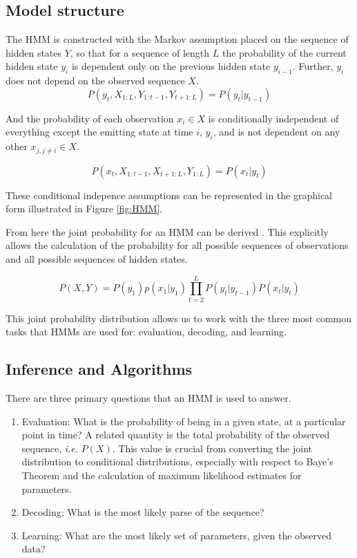 \subsection{Model structure}
The HMM is constructed with the Markov assumption placed on the sequence of hidden states $Y$, so that for a sequence of length $L$ the probability of the current hidden state $y_i$ is dependent only on the previous hidden state $y_{i-1}$. Further, $y_i$ does not depend on the observed sequence $X$. 
\begin{equation}
    P(y_t,X_{1:L},Y_{1:t-1},Y_{t+1:L}) = P(y_t|y_{t-1})
\end{equation}

And the probability of each observation $x_i \in X$ is conditionally independent of everything except the emitting state at time $i$, $y_i$, and is not dependent on any other $x_{j,j\neq i} \in X$.

\begin{equation}
    P(x_t,X_{1:t-1},X_{t+1:L},Y_{1:L}) = P(x_t|y_t)
\end{equation}

These conditional indepence assumptions can be represented in the graphical form illustrated in Figure \ref{fig:HMM}. 

From here the joint probability for an HMM can be derived \cite{Rabiner1989ARecognition}. This explicitly allows the calculation of the probability for all possible sequences of observations and all possible sequences of hidden states. 

\begin{equation}
    P(X,Y) = P(y_1)p(x_1|y_1)\prod_{t=2}^L{P(y_t|y_{t-1})P(x_t|y_t)}
\label{eq:jointhmm}
\end{equation}

This joint probability distribution allows us to work with the three most common tasks that HMMs are used for: evaluation, decoding, and learning.
\subsection{Inference and Algorithms}
There are three primary questions that an HMM is used to answer. 

\begin{enumerate}
    \item Evaluation: What is the probability of being in a given state, at a particular point in time? A related quantity is the total probability of the observed sequence, \emph{i.e.} $P(X)$. This value is crucial from converting the joint distribution to conditional distributions, especially with respect to Baye's Theorem and the calculation of maximum likelihood estimates for parameters.
    \item Decoding: What is the most likely parse of the sequence? 
    \item Learning: What are the most likely set of parameters, given the observed data?
\end{enumerate}


